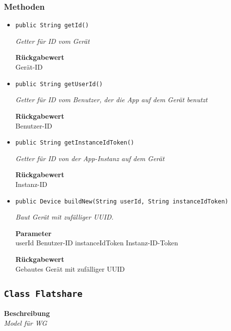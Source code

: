     \subsubsection{Methoden}
    \begin{itemize}
    	\item{\texttt{public String getId()}}
    	
    	\textit{Getter für ID vom Gerät}
    	
    	
    	
    	\textbf{Rückgabewert} \\
    	Gerät-ID        \item{\texttt{public String getUserId()}}
    	
    	\textit{Getter für ID vom Benutzer, der die App auf dem Gerät benutzt}
    	
    	
    	
    	\textbf{Rückgabewert} \\
    	Benutzer-ID        \item{\texttt{public String getInstanceIdToken()}}
    	
    	\textit{Getter für ID von der App-Instanz auf dem Gerät}
    	
    	
    	
    	\textbf{Rückgabewert} \\
    	Instanz-ID        \item{\texttt{public Device buildNew(String userId, String instanceIdToken)}}
    	
    	\textit{Baut Gerät mit zufälliger UUID.}
    	
    	\textbf{Parameter} \\
    	userId Benutzer-ID
    	instanceIdToken Instanz-ID-Token
    	
    	\textbf{Rückgabewert} \\
    	Gebautes Gerät mit zufälliger UUID
    \end{itemize}
    \subsection{\texttt{Class Flatshare}}
    \textbf{Beschreibung} \\
    \textit{Model für WG}
